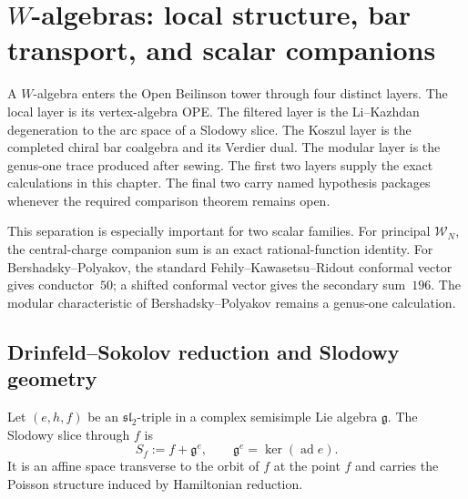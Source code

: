 \providecommand{\BRST}{\mathrm{BRST}}
\providecommand{\BRSTGauged}{\mathrm{BRSTGaugedChirAlg}}
\providecommand{\BP}{\mathrm{BP}}
\providecommand{\ClaimStatusComputed}{\textnormal{[computed]}}
\providecommand{\ClaimStatusOpen}{\textnormal{[open]}}

\chapter{$W$-algebras: local structure, bar transport, and scalar
companions}
\label{chap:w-algebra-koszul}
\label{chap:w-algebras}

A $W$-algebra enters the Open Beilinson tower through four distinct
layers.  The local layer is its vertex-algebra OPE\@.  The filtered layer
is the Li--Kazhdan degeneration to the arc space of a Slodowy slice.
The Koszul layer is the completed chiral bar coalgebra and its Verdier
dual.  The modular layer is the genus-one trace produced after sewing.
The first two layers supply the exact calculations in this chapter.
The final two carry named hypothesis packages whenever the required
comparison theorem remains open.

This separation is especially important for two scalar families.  For
principal $\mathcal W_N$, the central-charge companion sum is an exact
rational-function identity.  For Bershadsky--Polyakov, the standard
Fehily--Kawasetsu--Ridout conformal vector gives conductor~$50$; a
shifted conformal vector gives the secondary sum~$196$.  The modular
characteristic of Bershadsky--Polyakov remains a genus-one
calculation.

\section{Drinfeld--Sokolov reduction and Slodowy geometry}

\begin{definition}
\label{def:slodowy-slice}
Let $(e,h,f)$ be an $\mathfrak{sl}_2$-triple in a complex semisimple
Lie algebra $\mathfrak g$.  The Slodowy slice through $f$ is
\begin{equation}\label{eq:slodowy-slice-repaired}
S_f:=f+\mathfrak g^e,
\qquad
\mathfrak g^e=\ker(\operatorname{ad}e).
\end{equation}
It is an affine space transverse to the orbit of $f$ at the point
$f$ and carries the Poisson structure induced by Hamiltonian
reduction.
\end{definition}

